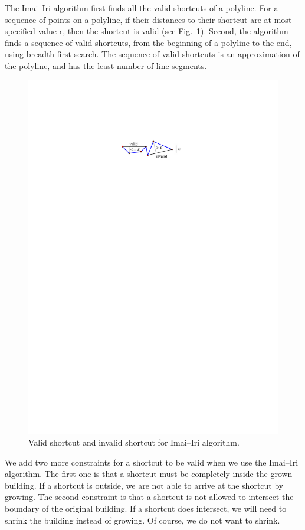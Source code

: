 \documentclass[graybox]{svmult}
\newcommand{\fig}{Fig.~}
\begin{document}
The Imai--Iri algorithm first finds all the valid shortcuts of a polyline.
For a sequence of points on a polyline, 
if their distances to their shortcut are 
at most specified value $\epsilon$, then the shortcut is valid (see 
\fig\ref{fig:ImaiIri_Shortcut}). 
Second, the algorithm finds a sequence of valid shortcuts, from the beginning 
of a polyline to the end, using breadth-first search.
The sequence of valid shortcuts is an approximation of the polyline, 
and has the least number of line segments.

\begin{figure}[tb]
	\centering
	\includegraphics{ImaiIri_Shortcut}
	\caption{Valid shortcut and invalid shortcut for Imai--Iri algorithm.}
	\label{fig:ImaiIri_Shortcut}
\end{figure}

We add two more constraints for a shortcut to be valid
when we use the Imai--Iri algorithm. 
The first one is that
a shortcut must be completely inside the grown building.
If a shortcut is outside,
we are not able to arrive at the shortcut by growing.
The second constraint is that a shortcut is not allowed to intersect the 
boundary of the original building.
If a shortcut does intersect, 
we will need to shrink the building instead of growing. Of course, we do not 
want to shrink.
\end{document}
